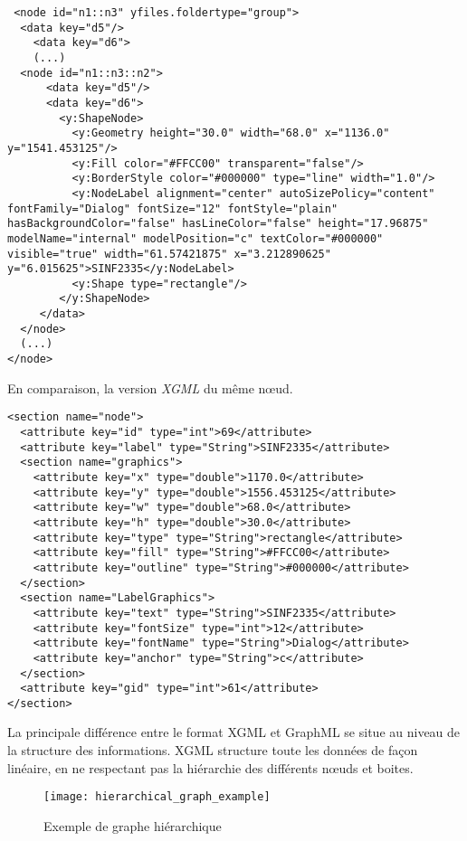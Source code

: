 \begin{lstlisting}
 <node id="n1::n3" yfiles.foldertype="group">
  <data key="d5"/>
    <data key="d6">
    (...)
  <node id="n1::n3::n2">
      <data key="d5"/>
      <data key="d6">
        <y:ShapeNode>
          <y:Geometry height="30.0" width="68.0" x="1136.0" y="1541.453125"/>
          <y:Fill color="#FFCC00" transparent="false"/>
          <y:BorderStyle color="#000000" type="line" width="1.0"/>
          <y:NodeLabel alignment="center" autoSizePolicy="content" fontFamily="Dialog" fontSize="12" fontStyle="plain" hasBackgroundColor="false" hasLineColor="false" height="17.96875" modelName="internal" modelPosition="c" textColor="#000000" visible="true" width="61.57421875" x="3.212890625" y="6.015625">SINF2335</y:NodeLabel>
          <y:Shape type="rectangle"/>
        </y:ShapeNode>
     </data>
  </node>
  (...)
</node>
\end{lstlisting}

En comparaison, la version \textit{XGML} du même nœud.
\begin{lstlisting}
<section name="node">
  <attribute key="id" type="int">69</attribute>
  <attribute key="label" type="String">SINF2335</attribute>
  <section name="graphics">
    <attribute key="x" type="double">1170.0</attribute>
    <attribute key="y" type="double">1556.453125</attribute>
    <attribute key="w" type="double">68.0</attribute>
    <attribute key="h" type="double">30.0</attribute>
    <attribute key="type" type="String">rectangle</attribute>
    <attribute key="fill" type="String">#FFCC00</attribute>
    <attribute key="outline" type="String">#000000</attribute>
  </section>
  <section name="LabelGraphics">
    <attribute key="text" type="String">SINF2335</attribute>
    <attribute key="fontSize" type="int">12</attribute>
    <attribute key="fontName" type="String">Dialog</attribute>
    <attribute key="anchor" type="String">c</attribute>
  </section>
  <attribute key="gid" type="int">61</attribute>
</section>
\end{lstlisting}

La principale différence entre le format XGML et GraphML se situe au niveau de la structure des informations. XGML structure toute les données de façon linéaire, en ne respectant pas la hiérarchie des différents nœuds et boites.

\begin{figure}[H]
\centering
\caption{Exemple de graphe hiérarchique} 
\label{fig:hierarchical_graph_example}
\texttt{[image: hierarchical\_graph\_example]}
\end{figure}

